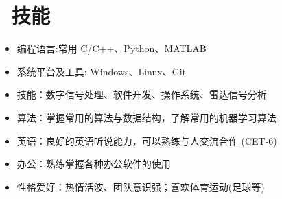 \documentclass{resume}
\begin{document}
\section{\faCogs\ 技能}
\begin{itemize}[parsep=0.5ex]
  \item 编程语言:常用 C/C++、Python、MATLAB  
  \item 系统平台及工具: Windows、Linux、Git
  \item 技能：数字信号处理、软件开发、操作系统、雷达信号分析
  \item 算法：掌握常用的算法与数据结构，了解常用的机器学习算法
  \item 英语：良好的英语听说能力，可以熟练与人交流合作 (CET-6)
  \item  办公：熟练掌握各种办公软件的使用
  \item  性格爱好：热情活波、团队意识强；喜欢体育运动(足球等)
\end{itemize}
\end{document}

